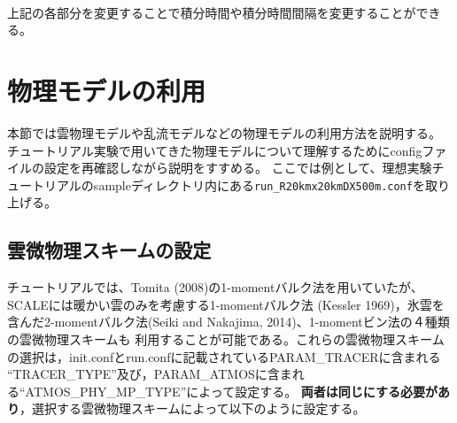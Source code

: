 {\small {\gt
{}}}\\

上記の各部分を変更することで積分時間や積分時間間隔を変更することができる。


\section{物理モデルの利用} \label{sec:adv_physics}
本節では雲物理モデルや乱流モデルなどの物理モデルの利用方法を説明する。
チュートリアル実験で用いてきた物理モデルについて理解するためにconfigファイルの設定を再確認しながら説明をすすめる。
ここでは例として、理想実験チュートリアルのsampleディレクトリ内にある\verb|run_R20kmx20kmDX500m.conf|を取り上げる。


\subsection{雲微物理スキームの設定} \label{sec:adv_microphys}
チュートリアルでは、Tomita (2008)の1-momentバルク法を用いていたが、SCALEには暖かい雲のみを考慮する1-momentバルク法
(Kessler 1969)，氷雲を含んだ2-momentバルク法(Seiki and Nakajima, 2014)、1-momentビン法の４種類の雲微物理スキームも
利用することが可能である。これらの雲微物理スキームの選択は，init.confとrun.confに記載されているPARAM\_TRACERに含まれる
``TRACER\_TYPE''及び，PARAM\_ATMOSに含まれる``ATMOS\_PHY\_MP\_TYPE''によって設定する。
{\bf 両者は同じにする必要があり}，選択する雲微物理スキームによって以下のように設定する。

